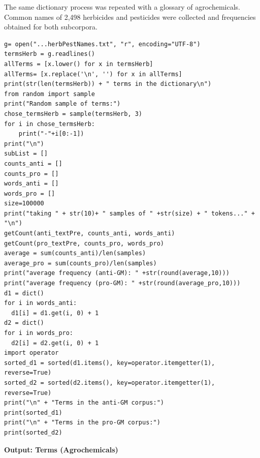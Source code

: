 The same dictionary process was repeated with a glossary of agrochemicals. Common names of 2,498 herbicides and pesticides were collected and frequencies obtained for both subcorpora.

\begin{lstlisting}
g= open("...herbPestNames.txt", "r", encoding="UTF-8")
termsHerb = g.readlines()
allTerms = [x.lower() for x in termsHerb]
allTerms= [x.replace('\n', '') for x in allTerms]
print(str(len(termsHerb)) + " terms in the dictionary\n") 
from random import sample
print("Random sample of terms:")
chose_termsHerb = sample(termsHerb, 3)
for i in chose_termsHerb:
    print("-"+i[0:-1])
print("\n")
subList = []
counts_anti = []
counts_pro = []
words_anti = []
words_pro = []
size=100000
print("taking " + str(10)+ " samples of " +str(size) + " tokens..." + "\n")
getCount(anti_textPre, counts_anti, words_anti)    
getCount(pro_textPre, counts_pro, words_pro)
average = sum(counts_anti)/len(samples)
average_pro = sum(counts_pro)/len(samples)
print("average frequency (anti-GM): " +str(round(average,10)))
print("average frequency (pro-GM): " +str(round(average_pro,10)))
d1 = dict()
for i in words_anti:
  d1[i] = d1.get(i, 0) + 1
d2 = dict()
for i in words_pro:
  d2[i] = d2.get(i, 0) + 1
import operator
sorted_d1 = sorted(d1.items(), key=operator.itemgetter(1), reverse=True)
sorted_d2 = sorted(d2.items(), key=operator.itemgetter(1), reverse=True)
print("\n" + "Terms in the anti-GM corpus:")
print(sorted_d1)
print("\n" + "Terms in the pro-GM corpus:")
print(sorted_d2)
\end{lstlisting}

\textbf{Output: Terms (Agrochemicals)}

